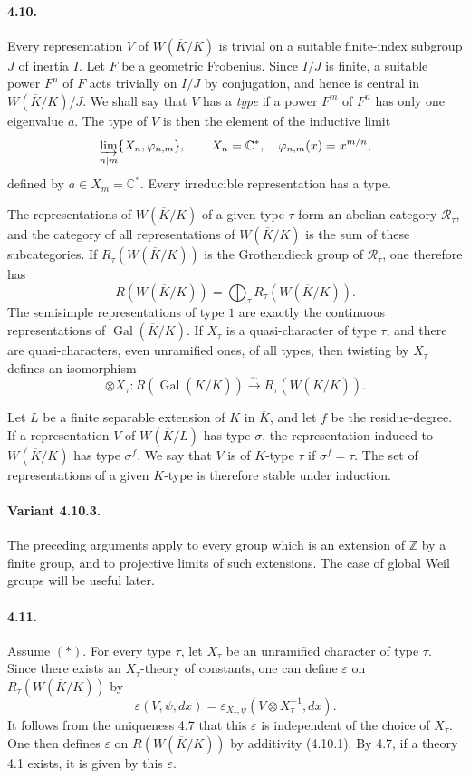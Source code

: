 \documentclass[10pt,letterpaper]{article}
\newcommand{\C}{\mathbb C}
\newcommand{\Z}{\mathbb Z}
\newcommand{\Gal}{\operatorname{Gal}}
\newcommand{\iso}{\xrightarrow{\sim}}
\providecommand{\Gal}{\operatorname{Gal}}
\providecommand{\Gal}{\operatorname{Gal}}
\providecommand{\Gal}{\operatorname{Gal}}
\providecommand{\Gal}{\operatorname{Gal}}
\begin{document}
\paragraph{4.10.} Every representation \(V\) of \(W(\overline K/K)\) is trivial on a suitable finite-index subgroup \(J\) of inertia \(I\). Let \(F\) be a geometric Frobenius. Since \(I/J\) is finite, a suitable power \(F^n\) of \(F\) acts trivially on \(I/J\) by conjugation, and hence is central in \(W(\overline K/K)/J\). We shall say that \(V\) has a \emph{type} if a power \(F^m\) of \(F^n\) has only one eigenvalue \(a\). The type of \(V\) is then the element of the inductive limit
\[
\varinjlim_{n\mid m}\{X_n,\varphi_{n,m}\},\qquad
X_n=\C^*,\quad \varphi_{n,m}(x)=x^{m/n},
\]
defined by \(a\in X_m=\C^*\). Every irreducible representation has a type.

The representations of \(W(\overline K/K)\) of a given type \(\tau\) form an abelian category \(\mathcal R_\tau\), and the category of all representations of \(W(\overline K/K)\) is the sum of these subcategories. If \(R_\tau(W(\overline K/K))\) is the Grothendieck group of \(\mathcal R_\tau\), one therefore has
\[
\tag{4.10.1}
R(W(\overline K/K))=\bigoplus_\tau R_\tau(W(\overline K/K)).
\]
The semisimple representations of type \(1\) are exactly the continuous representations of \(\Gal(\overline K/K)\). If \(X_\tau\) is a quasi-character of type \(\tau\), and there are quasi-characters, even unramified ones, of all types, then twisting by \(X_\tau\) defines an isomorphism
\[
\tag{4.10.2}
\otimes X_\tau:R(\Gal(\overline K/K))\iso R_\tau(W(\overline K/K)).
\]

Let \(L\) be a finite separable extension of \(K\) in \(\overline K\), and let \(f\) be the residue-degree. If a representation \(V\) of \(W(\overline K/L)\) has type \(\sigma\), the representation induced to \(W(\overline K/K)\) has type \(\sigma^f\). We say that \(V\) is of \(K\)-type \(\tau\) if \(\sigma^f=\tau\). The set of representations of a given \(K\)-type is therefore stable under induction.

\paragraph{Variant 4.10.3.} The preceding arguments apply to every group which is an extension of \(\Z\) by a finite group, and to projective limits of such extensions. The case of global Weil groups will be useful later.

\paragraph{4.11.} Assume \((*)\). For every type \(\tau\), let \(X_\tau\) be an unramified character of type \(\tau\). Since there exists an \(X_\tau\)-theory of constants, one can define \(\varepsilon\) on \(R_\tau(W(\overline K/K))\) by
\[
\varepsilon(V,\psi,dx)=
\varepsilon_{X_\tau,\psi}(V\otimes X_\tau^{-1},dx).
\]
It follows from the uniqueness 4.7 that this \(\varepsilon\) is independent of the choice of \(X_\tau\). One then defines \(\varepsilon\) on \(R(W(\overline K/K))\) by additivity (4.10.1). By 4.7, if a theory 4.1 exists, it is given by this \(\varepsilon\).
\end{document}
